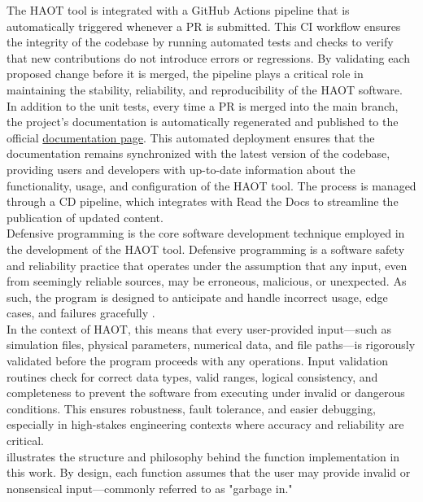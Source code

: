 The \gls{HAOT} tool is integrated with a GitHub Actions pipeline that is
automatically triggered whenever a \gls{PR} is submitted. This \gls{CI}
workflow ensures the integrity of the codebase by running automated tests and
checks to verify that new contributions do not introduce errors or regressions.
By validating each proposed change before it is merged, the pipeline plays a
critical role in maintaining the stability, reliability, and reproducibility of
the \gls{HAOT} software. \\

In addition to the unit tests, every time a \gls{PR} is merged into the main
branch, the project’s documentation is automatically regenerated and published
to the official \href{https://haot.readthedocs.io/en/latest/}{documentation
page}. This automated deployment ensures that the documentation remains
synchronized with the latest version of the codebase, providing users and
developers with up-to-date information about the functionality, usage, and
configuration of the \gls{HAOT} tool. The process is managed through a \gls{CD}
pipeline, which integrates with Read the Docs to streamline the publication of
updated content. \\ 

Defensive programming is the core software development technique employed in
the development of the \gls{HAOT} tool. Defensive programming is a software
safety and reliability practice that operates under the assumption that any
input, even from seemingly reliable sources, may be erroneous, malicious, or
unexpected. As such, the program is designed to anticipate and handle incorrect
usage, edge cases, and failures gracefully \cite{Denault2006}. \\

In the context of \gls{HAOT}, this means that every user-provided input—such as
simulation files, physical parameters, numerical data, and file paths—is
rigorously validated before the program proceeds with any operations. Input
validation routines check for correct data types, valid ranges, logical
consistency, and completeness to prevent the software from executing under
invalid or dangerous conditions. This ensures robustness, fault tolerance, and
easier debugging, especially in high-stakes engineering contexts where accuracy
and reliability are critical. \\

 illustrates the structure and philosophy behind
the function implementation in this work. By design, each function assumes that
the user may provide invalid or nonsensical input—commonly referred to as
"garbage in."\\

